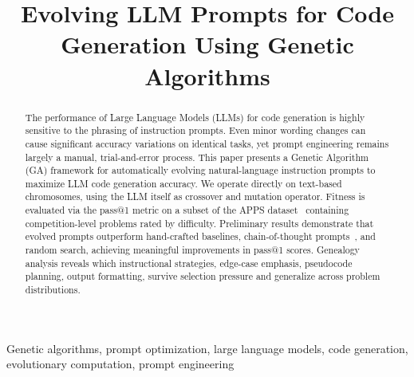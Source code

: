 \documentclass[conference]{IEEEtran}
\begin{document}
\title{Evolving LLM Prompts for Code Generation Using Genetic Algorithms}

\author{
}

\maketitle

\begin{abstract}
The performance of Large Language Models (LLMs) for code generation is highly sensitive
to the phrasing of instruction prompts. Even minor wording changes can cause significant
accuracy variations on identical tasks, yet prompt engineering remains largely a manual,
trial-and-error process. This paper presents a Genetic Algorithm (GA) framework for
automatically evolving natural-language instruction prompts to maximize LLM code generation
accuracy. We operate directly on text-based chromosomes, using the LLM itself as crossover
and mutation operator. Fitness is evaluated via the pass@1 metric on a subset of the APPS dataset~\cite{hendrycks2021apps}
containing competition-level problems rated by difficulty. Preliminary results
demonstrate that evolved prompts outperform hand-crafted baselines, chain-of-thought prompts~\cite{wei2022cot},
and random search, achieving meaningful improvements in pass@1 scores. Genealogy analysis
reveals which instructional strategies, edge-case emphasis, pseudocode planning, output
formatting, survive selection pressure and generalize across problem distributions.
\end{abstract}

\begin{IEEEkeywords}
Genetic algorithms, prompt optimization, large language models, code generation,
evolutionary computation, prompt engineering
\end{IEEEkeywords}
\end{document}
